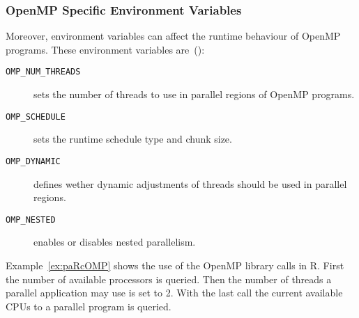 \subsubsection{OpenMP Specific Environment Variables}

Moreover, environment variables can affect the runtime behaviour of
OpenMP programs. These environment variables are~(\cite{openMP05}):

\begin{description}
\item[\texttt{OMP\_NUM\_THREADS}] sets the number of threads to use in
  parallel regions of OpenMP programs. 
\item[\texttt{OMP\_SCHEDULE}] sets the runtime schedule type and
  chunk size.
\item[\texttt{OMP\_DYNAMIC}] defines wether dynamic adjustments of threads
  should be used in parallel regions.
\item[\texttt{OMP\_NESTED}] enables or disables nested parallelism.
\end{description}

Example~\ref{ex:paRcOMP} shows the use of the OpenMP library calls in
R. First the number of available processors is queried. Then the
number of threads a parallel application may use is set to 2. With the
last call the current available CPUs to a parallel program is queried.

